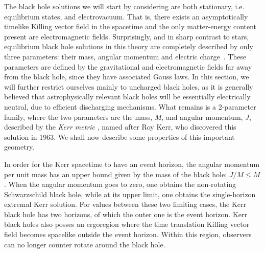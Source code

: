 The black hole solutions we will start by considering are both stationary, i.e. equilibrium states, and electrovacuum.
That is, there exists an asymptotically timelike Killing vector field in the spacetime and the only matter-energy content present are electromagnetic fields.
Surprisingly, and in sharp contrast to stars, equilibrium black hole solutions in this theory are completely described by only three parameters: their mass, angular momentum and electric charge~\cite{Chrusciel:2012jk}.
These parameters are defined by the gravitational and electromagnetic fields far away from the black hole, since they have associated Gauss laws.
In this section, we will further restrict ourselves mainly to uncharged black holes, as it is generally believed that astrophysically relevant black holes will be essentially electrically neutral, due to efficient discharging mechanisms.
What remains is a 2-parameter family, where the two parameters are the mass, $M$, and angular momentum, $J$, described by the \textit{Kerr metric} \cite{Kerr:1963ud}, named after Roy Kerr, who discovered this solution in 1963.
We shall now describe some properties of this important geometry.

In order for the Kerr spacetime to have an event horizon, the angular momentum per unit mass has an upper bound given by the mass of the black hole: $J/M\le M$.
When the angular momentum goes to zero, one obtains the non-rotating Schwarzschild black hole, while at its upper limit, one obtains the single-horizon extremal Kerr solution.
For values between these two limiting cases, the Kerr black hole has two horizons, of which the outer one is the event horizon.
Kerr black holes also posses an ergoregion where the time translation Killing vector field becomes spacelike outside the event horizon.
Within this region, observers can no longer counter rotate around the black hole.

